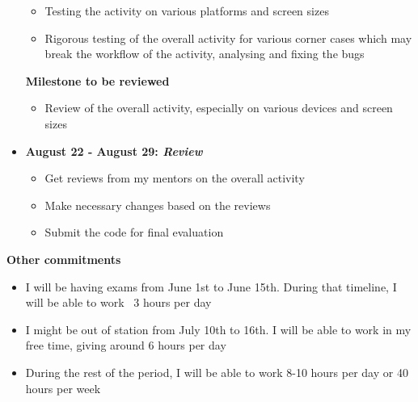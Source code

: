 \documentclass[preprint,12pt]{elsarticle}
\begin{document}
\begin{itemize}
\begin{itemize}
\item Testing the activity on various platforms and screen sizes
\item Rigorous testing of the overall activity for various corner cases which may break the workflow of the activity, analysing and fixing the bugs
\end{itemize}

\textbf{Milestone to be reviewed}
\begin{itemize}
\item Review of the overall activity, especially on various devices and screen sizes
\end{itemize}

\item \textbf{August 22 - August 29: \textit{Review}}

\begin{itemize}
\item Get reviews from my mentors on the overall activity
\item Make necessary changes based on the reviews
\item Submit the code for final evaluation
\end{itemize}

\end{itemize}



\textbf{Other commitments}

\begin{itemize}
\item I will be having exams from June 1st to June 15th. During that timeline, I will be able to work ~3 hours per day
\item I might be out of station from July 10th to 16th. I will be able to work in my free time, giving around 6 hours per day
\item During the rest of the period, I will be able to work 8-10 hours per day or 40 hours per week
\end{itemize}
\end{document}
